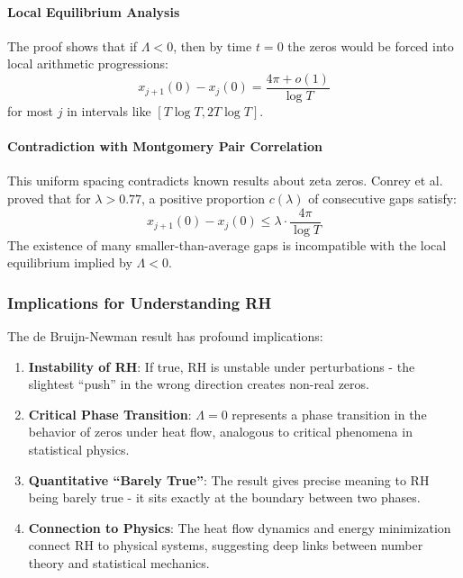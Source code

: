 \paragraph{Local Equilibrium Analysis} The proof shows that if $\Lambda < 0$, then by time $t = 0$ the zeros would be forced into local arithmetic progressions:
\begin{equation}
x_{j+1}(0) - x_j(0) = \frac{4\pi + o(1)}{\log T}
\end{equation}
for most $j$ in intervals like $[T\log T, 2T\log T]$.

\paragraph{Contradiction with Montgomery Pair Correlation} This uniform spacing contradicts known results about zeta zeros. Conrey et al. proved that for $\lambda > 0.77$, a positive proportion $c(\lambda)$ of consecutive gaps satisfy:
\begin{equation}
x_{j+1}(0) - x_j(0) \leq \lambda \cdot \frac{4\pi}{\log T}
\end{equation}
The existence of many smaller-than-average gaps is incompatible with the local equilibrium implied by $\Lambda < 0$.

\subsubsection{Implications for Understanding RH}

The de Bruijn-Newman result has profound implications:

\begin{enumerate}
\item \textbf{Instability of RH}: If true, RH is unstable under perturbations - the slightest ``push'' in the wrong direction creates non-real zeros.

\item \textbf{Critical Phase Transition}: $\Lambda = 0$ represents a phase transition in the behavior of zeros under heat flow, analogous to critical phenomena in statistical physics.

\item \textbf{Quantitative ``Barely True''}: The result gives precise meaning to RH being barely true - it sits exactly at the boundary between two phases.

\item \textbf{Connection to Physics}: The heat flow dynamics and energy minimization connect RH to physical systems, suggesting deep links between number theory and statistical mechanics.
\end{enumerate}

